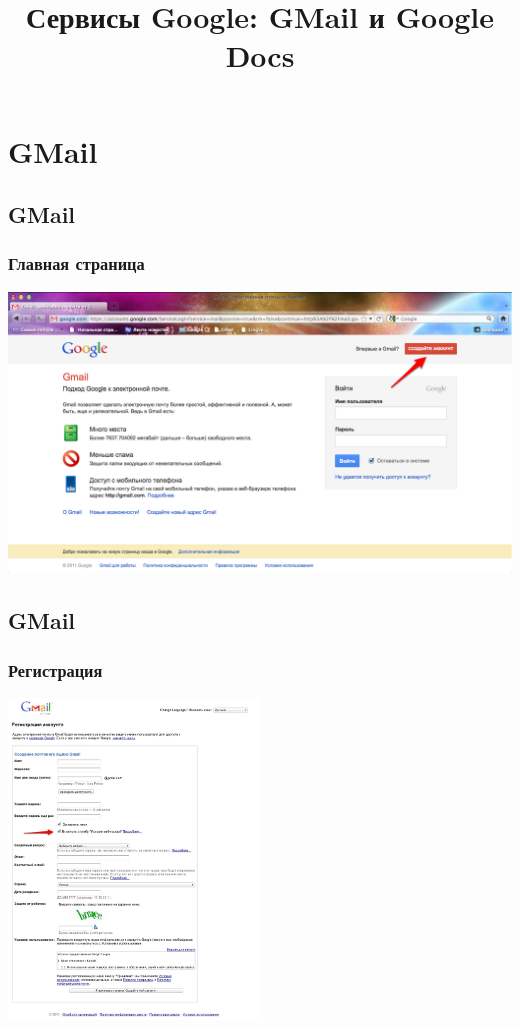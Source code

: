 \documentclass[compress,red]{beamer}
\title{Сервисы Google: GMail и Google Docs}
\author{ }
\date{ }
\begin{document}
\maketitle

\section{GMail}
\subsection{GMail}
\begin{frame}
  \frametitle{Главная страница}
    \centerline{\includegraphics[width=1.0\textwidth]{images/gmail-01.png}}
\end{frame}

\subsection{GMail}
\begin{frame}
  \frametitle{Регистрация}
    \centerline{\includegraphics[width=0.5\textwidth]{images/gmail-02.png}}
\end{frame}
\end{document}
